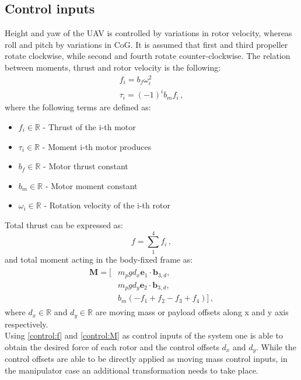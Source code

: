 \subsection{Control inputs}
\indent Height and yaw of the UAV is controlled by variations in rotor velocity, whereas roll and pitch by variations in CoG. It is assumed that first and third propeller rotate clockwise, while second and fourth rotate counter-clockwise. The relation between moments, thrust and rotor velocity is the following:
\begin{gather}
	f_i = b_f \omega_{i}^2 \label{force}\\
	\tau_i = (-1)^i b_m f_i \, ,
\end{gather}
where the following terms are defined as:
\begin{itemize}
	\item $f_i \in \mathbb{R}$ - Thrust of the i-th motor
	
	\item $\tau_i \in \mathbb{R}$ - Moment i-th motor produces
	
	\item $b_f \in \mathbb{R}$ - Motor thrust constant
	
	\item $b_m \in \mathbb{R}$ - Motor moment constant
	
	\item $\omega_i \in \mathbb{R}$ - Rotation velocity of the i-th rotor
\end{itemize}
Total thrust can be expressed as:
\begin{equation}
	f = \sum_{1}^{4}f_i \, , \label{control:f}
\end{equation}
and total moment acting in the body-fixed frame as:
\begin{align}
	\begin{split} \label{control:M}
	\textbf{M} = [&m_{p}gd_x  \textbf{e}_1 \cdot \textbf{b}_{3,d} , \\
	&m_{p}gd_y \textbf{e}_2 \cdot \textbf{b}_{3,d}, \\
	&b_m(-f_1 + f_2 - f_3 + f_4)] \, ,
	\end{split}
\end{align}
where $d_x \in \mathbb{R}$ and $d_y \in \mathbb{R}$ are moving mass or payload offsets along x and y axis respectively. \\
Using \eqref{control:f} and \eqref{control:M} as control inputs of the system one is able to obtain the desired force of each rotor and the control offsets $d_x$ and $d_y$. While the control offsets are able to be directly applied as moving mass control inputs, in the manipulator case an additional transformation needs to take place. \\
